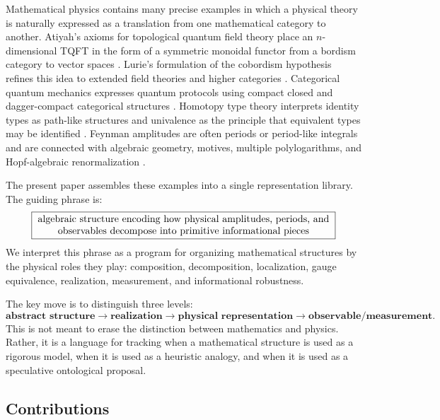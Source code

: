 \documentclass[11pt]{article}
\begin{document}
Mathematical physics contains many precise examples in which a physical theory is naturally expressed as a translation from one mathematical category to another. Atiyah's axioms for topological quantum field theory place an $n$-dimensional TQFT in the form of a symmetric monoidal functor from a bordism category to vector spaces \cite{Atiyah1988}. Lurie's formulation of the cobordism hypothesis refines this idea to extended field theories and higher categories \cite{Lurie2009}. Categorical quantum mechanics expresses quantum protocols using compact closed and dagger-compact categorical structures \cite{AbramskyCoecke2004,BaezStay2009}. Homotopy type theory interprets identity types as path-like structures and univalence as the principle that equivalent types may be identified \cite{HoTT2013}. Feynman amplitudes are often periods or period-like integrals and are connected with algebraic geometry, motives, multiple polylogarithms, and Hopf-algebraic renormalization \cite{KontsevichZagier2001,ConnesKreimer1999,Goncharov2001,Brown2015Periods,BlochEsnaultKreimer2006}.

The present paper assembles these examples into a single representation library. The guiding phrase is:
\[
\boxed{\begin{minipage}{0.87\textwidth}\centering
algebraic structure encoding how physical amplitudes, periods, and observables\
decompose into primitive informational pieces
\end{minipage}}
\]
We interpret this phrase as a program for organizing mathematical structures by the physical roles they play: composition, decomposition, localization, gauge equivalence, realization, measurement, and informational robustness.

The key move is to distinguish three levels:
\[
\textbf{abstract structure}\longrightarrow \textbf{realization}\longrightarrow \textbf{physical representation}\longrightarrow \textbf{observable/measurement}.
\]
This is not meant to erase the distinction between mathematics and physics. Rather, it is a language for tracking when a mathematical structure is used as a rigorous model, when it is used as a heuristic analogy, and when it is used as a speculative ontological proposal.

\subsection{Contributions}
\end{document}

